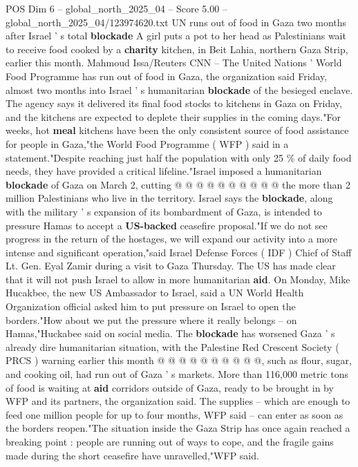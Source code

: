 \begin{textsample}{POS Dim 6 – global\_north\_2025\_04 – Score 5.00 – global\_north\_2025\_04/123974620.txt}  \label{ex:f6_pos_210}
UN runs out of food in Gaza two months after Israel ' s total \textbf{blockade} A girl puts a pot to her head as Palestinians wait to receive food cooked by a \textbf{charity} kitchen, in Beit Lahia, northern Gaza Strip, earlier this month.
Mahmoud Issa/Reuters CNN -- The United Nations ' World Food Programme has run out of food in Gaza, the organization said Friday, almost two months into Israel ' s humanitarian \textbf{blockade} of the besieged enclave.
The agency says it delivered its final food stocks to kitchens in Gaza on Friday, and the kitchens are expected to deplete their supplies in the coming days."For weeks, hot \textbf{meal} kitchens have been the only consistent source of food assistance for people in Gaza,"the World Food Programme ( WFP ) said in a statement."Despite reaching just half the population with only 25 \% of daily food needs, they have provided a critical lifeline."Israel imposed a humanitarian \textbf{blockade} of Gaza on March 2, cutting @ @ @ @ @ @ @ @ @ @ the more than 2 million Palestinians who live in the territory.
Israel says the \textbf{blockade}, along with the military ' s expansion of its bombardment of Gaza, is intended to pressure Hamas to accept a \textbf{US-backed} ceasefire proposal."If we do not see progress in the return of the hostages, we will expand our activity into a more intense and significant operation,"said Israel Defense Forces ( IDF ) Chief of Staff Lt.
Gen.
Eyal Zamir during a visit to Gaza Thursday.
The US has made clear that it will not push Israel to allow in more humanitarian \textbf{aid}.
On Monday, Mike Hucakbee, the new US Ambassador to Israel, said a UN World Health Organization official asked him to put pressure on Israel to open the borders."How about we put the pressure where it really belongs -- on Hamas,"Huckabee said on social media.
The \textbf{blockade} has worsened Gaza ' s already dire humanitarian situation, with the Palestine Red Crescent Society ( PRCS ) warning earlier this month @ @ @ @ @ @ @ @ @ @, such as flour, sugar, and cooking oil, had run out of Gaza ' s markets.
More than 116,000 metric tons of food is waiting at \textbf{aid} corridors outside of Gaza, ready to be brought in by WFP and its partners, the organization said.
The supplies -- which are enough to feed one million people for up to four months, WFP said -- can enter as soon as the borders reopen."The situation inside the Gaza Strip has once again reached a breaking point : people are running out of ways to cope, and the fragile gains made during the short ceasefire have unravelled,"WFP said.

\end{textsample}
